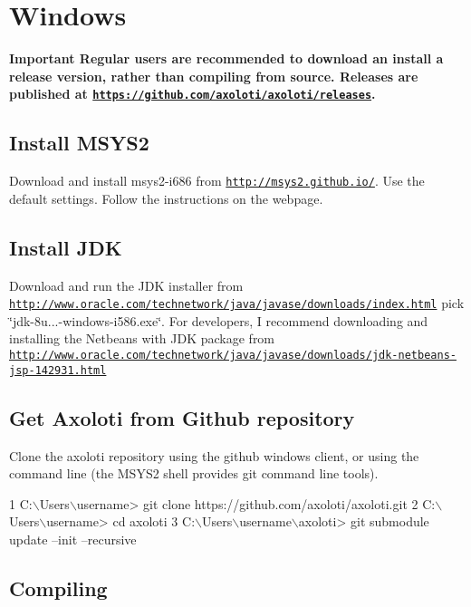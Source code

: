 \hypertarget{compile_compile_on_win}{}\section{Windows}\label{compile_compile_on_win}
{\bfseries  Important Regular users are recommended to download an install a release version, rather than compiling from source. Releases are published at \href{https://github.com/axoloti/axoloti/releases}{\tt https\+://github.\+com/axoloti/axoloti/releases}. }\hypertarget{compile_compile_on_win_msys2}{}\subsection{Install M\+S\+Y\+S2}\label{compile_compile_on_win_msys2}
Download and install msys2-\/i686 from \href{http://msys2.github.io/}{\tt http\+://msys2.\+github.\+io/}. Use the default settings. Follow the instructions on the webpage.\hypertarget{compile_compile_on_win_jdk}{}\subsection{Install J\+DK}\label{compile_compile_on_win_jdk}
Download and run the J\+DK installer from \href{http://www.oracle.com/technetwork/java/javase/downloads/index.html}{\tt http\+://www.\+oracle.\+com/technetwork/java/javase/downloads/index.\+html} pick \char`\"{}jdk-\/8u...-\/windows-\/i586.\+exe\char`\"{}. For developers, I recommend downloading and installing the Netbeans with J\+DK package from \href{http://www.oracle.com/technetwork/java/javase/downloads/jdk-netbeans-jsp-142931.html}{\tt http\+://www.\+oracle.\+com/technetwork/java/javase/downloads/jdk-\/netbeans-\/jsp-\/142931.\+html}\hypertarget{compile_compile_on_win_axoloti_src}{}\subsection{Get Axoloti from Github repository}\label{compile_compile_on_win_axoloti_src}
Clone the axoloti repository using the github windows client, or using the command line (the M\+S\+Y\+S2 shell provides git command line tools). 
\begin{DoxyCode}
1 C:\(\backslash\)Users\(\backslash\)username> git clone https://github.com/axoloti/axoloti.git
2 C:\(\backslash\)Users\(\backslash\)username> cd axoloti
3 C:\(\backslash\)Users\(\backslash\)username\(\backslash\)axoloti> git submodule update --init --recursive      
\end{DoxyCode}
\hypertarget{compile_compile_on_win_compiling}{}\subsection{Compiling}\label{compile_compile_on_win_compiling}
